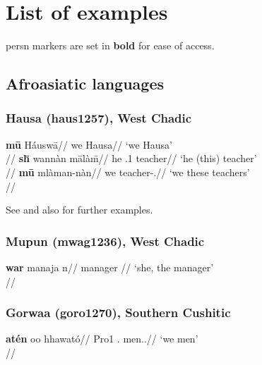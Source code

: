 
\section{List of examples}

\gls{persn} markers are set in \textbf{bold} for ease of access.


\subsection{Afroasiatic languages}


\subsubsection{Hausa (haus1257), West Chadic}

\pex
\a \begingl
\gla \textbf{m\={u}} Háusw\={a}//
\glb we Hausa//
\glft `we Hausa'\\\citep[371]{newman2000}//
\endgl
\a \begingl
\gla \textbf{sh\={\textsci}} wannàn m\={a}làm\={\textsci}//
\glb he \Dem{}.1 teacher//
\glft `he (this) teacher'\\{\citep[after][371]{newman2000}}//
\endgl
\a
\begingl
\gla \textbf{m\={u}} mlàman-nàn//
\glb we teacher-\Dem.\Prox{}//
\glft `we these teachers'\\\citep[155]{newman2000}//
\endgl
\xe

See \citet[63, 155, 370f.]{newman2000} and also \citet[330f.]{jaggar2001} for further examples.




\subsubsection{Mupun (mwag1236), West Chadic}
 
\ex
\begingl
\gla \textbf{war} manaja n\textschwa//
\F{} manager \Def{}//
\glft `she, the manager'\\\citep[after][172, (154)]{frajzyngier1993}//
\endgl
\xe
 
\subsubsection{Gorwaa (goro1270), Southern Cushitic}

\ex
\begingl
\gla \textbf{atén} oo hhawató//
\glb Pro1\Pl{} \Anaph.\M{} men.\Lnk.\M{}//
\glft `we men'\\\citep[after][163, (2.205)]{harvey2018}//
\endgl
\xe

